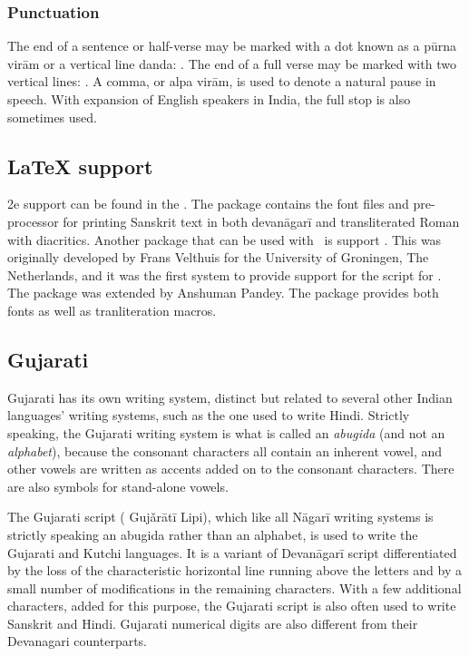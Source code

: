 \subsubsection{Punctuation} 
The end of a sentence or half-verse may be marked with a dot known as a pūrna virām or a vertical line danda: \textbar. The end of a full verse may be marked with two vertical lines: \textbar\textbar. A comma, or alpa virām, is used to denote a natural pause in speech. With expansion of English speakers in India, the full stop is also sometimes used.

\subsection{LaTeX support}

\latex2e support can be found in the . The package contains the font files and pre-processor for printing Sanskrit
text in both devanāgarī and transliterated Roman with diacritics. Another package that can be used with \XeTeX\ is support .  This was originally developed by Frans Velthuis for the University of Groningen, The Netherlands, and it was the first system to provide
support for the script for \tex. The package was  extended by Anshuman Pandey. The package provides both fonts as well as tranliteration macros.


\subsection{Gujarati}


Gujarati has its own writing system, distinct but related to several other Indian languages' writing systems, such as the one used to write Hindi. Strictly speaking, the Gujarati writing system is what is called an \emph{abugida} (and not an \textit{alphabet}), because the consonant characters all contain an inherent vowel, and other vowels are written as accents added on to the consonant characters. There are also symbols for stand-alone vowels.

The Gujarati script ({} Gujǎrātī Lipi), which like all Nāgarī writing systems is strictly speaking an abugida rather than an alphabet, is used to write the Gujarati and Kutchi languages. It is a variant of Devanāgarī script differentiated by the loss of the characteristic horizontal line running above the letters and by a small number of modifications in the remaining characters.
With a few additional characters, added for this purpose, the Gujarati script is also often used to write Sanskrit and Hindi.
Gujarati numerical digits are also different from their Devanagari counterparts.
\medskip

